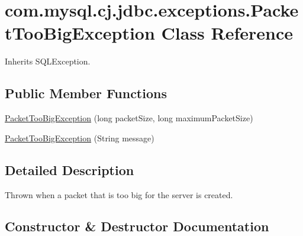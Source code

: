 \hypertarget{classcom_1_1mysql_1_1cj_1_1jdbc_1_1exceptions_1_1_packet_too_big_exception}{}\section{com.\+mysql.\+cj.\+jdbc.\+exceptions.\+Packet\+Too\+Big\+Exception Class Reference}
\label{classcom_1_1mysql_1_1cj_1_1jdbc_1_1exceptions_1_1_packet_too_big_exception}


Inherits S\+Q\+L\+Exception.

\subsection*{Public Member Functions}
\begin{DoxyCompactItemize}
\item 
\mbox{\hyperlink{classcom_1_1mysql_1_1cj_1_1jdbc_1_1exceptions_1_1_packet_too_big_exception_a2bc6304fec19a835419b191e67dd63b6}{Packet\+Too\+Big\+Exception}} (long packet\+Size, long maximum\+Packet\+Size)
\item 
\mbox{\hyperlink{classcom_1_1mysql_1_1cj_1_1jdbc_1_1exceptions_1_1_packet_too_big_exception_a41b9ee069f0dab7d92c1ff0be161f0fd}{Packet\+Too\+Big\+Exception}} (String message)
\end{DoxyCompactItemize}


\subsection{Detailed Description}
Thrown when a packet that is too big for the server is created. 

\subsection{Constructor \& Destructor Documentation}
\mbox{\label{classcom_1_1mysql_1_1cj_1_1jdbc_1_1exceptions_1_1_packet_too_big_exception_a2bc6304fec19a835419b191e67dd63b6}} 
